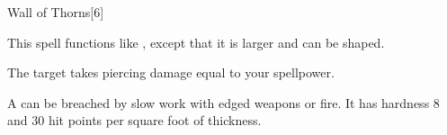 \begin{spellsection}[Greater]{Wall of Thorns}[6]
    \begin{spellheader}
    \end{spellheader}
    \begin{spellcontent}
        \begin{spelltargetinginfo}
        \end{spelltargetinginfo}
        \begin{spelleffects}
            \spellspecial This spell functions like , except that it is larger and can be shaped.
            \spelldur \durshort
        \end{spelleffects}
    \end{spellcontent}
    \begin{spellsubcontent}
        \begin{spelltargetinginfo}
        \end{spelltargetinginfo}
        \begin{spelleffects}
            \spelleffect The target takes piercing damage equal to your spellpower.
        \end{spelleffects}
    \end{spellsubcontent}
    \begin{spellfooter}
        \spellnotes A  can be breached by slow work with edged weapons or fire. It has hardness 8 and 30 hit points per square foot of thickness.

        \physicalspellnotes
        \miscastexplode
    \end{spellfooter}
\end{spellsection}

